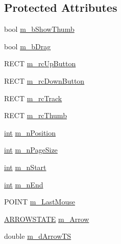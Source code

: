 \subsection*{Protected Attributes}
\begin{DoxyCompactItemize}
\item 
bool \hyperlink{class_c_d_x_u_t_scroll_bar_aa7a51e9a1a97f52f0c0867de95f2a348}{m\_\-bShowThumb}
\item 
bool \hyperlink{class_c_d_x_u_t_scroll_bar_a01ff830ad7a6126be8fe58c7d6c5a625}{m\_\-bDrag}
\item 
RECT \hyperlink{class_c_d_x_u_t_scroll_bar_af4d481a35224a1b9bd6d4b369b3c3dd1}{m\_\-rcUpButton}
\item 
RECT \hyperlink{class_c_d_x_u_t_scroll_bar_a7bd528426fbee3aefc6056e8bde9fece}{m\_\-rcDownButton}
\item 
RECT \hyperlink{class_c_d_x_u_t_scroll_bar_ae7da461cf4b1658f14ce9ec0d74e8dad}{m\_\-rcTrack}
\item 
RECT \hyperlink{class_c_d_x_u_t_scroll_bar_a6b29ad3dbc532c385fd0d67170aa732a}{m\_\-rcThumb}
\item 
\hyperlink{_d_x_u_tgui_8cpp_a2d77ed03302b6978834ee3b6f57837fb}{int} \hyperlink{class_c_d_x_u_t_scroll_bar_a56626224bbb2aa068c8d5d4bf2efeab9}{m\_\-nPosition}
\item 
\hyperlink{_d_x_u_tgui_8cpp_a2d77ed03302b6978834ee3b6f57837fb}{int} \hyperlink{class_c_d_x_u_t_scroll_bar_afb1955f3af80efd279c38d45882e67e0}{m\_\-nPageSize}
\item 
\hyperlink{_d_x_u_tgui_8cpp_a2d77ed03302b6978834ee3b6f57837fb}{int} \hyperlink{class_c_d_x_u_t_scroll_bar_a435f88f5790f27a818502da70f20c5bc}{m\_\-nStart}
\item 
\hyperlink{_d_x_u_tgui_8cpp_a2d77ed03302b6978834ee3b6f57837fb}{int} \hyperlink{class_c_d_x_u_t_scroll_bar_afc8b5ddb1c7cc92442d29e3cc23d11f1}{m\_\-nEnd}
\item 
POINT \hyperlink{class_c_d_x_u_t_scroll_bar_a1cde93aff0ec2547c01db9afcc508782}{m\_\-LastMouse}
\item 
\hyperlink{class_c_d_x_u_t_scroll_bar_a43b1ef354a17195db720617bf6b34595}{ARROWSTATE} \hyperlink{class_c_d_x_u_t_scroll_bar_a909a6087207d8187daacf84356fefbe8}{m\_\-Arrow}
\item 
double \hyperlink{class_c_d_x_u_t_scroll_bar_a0e16cf4d357346864321f471afa456cd}{m\_\-dArrowTS}
\end{DoxyCompactItemize}


